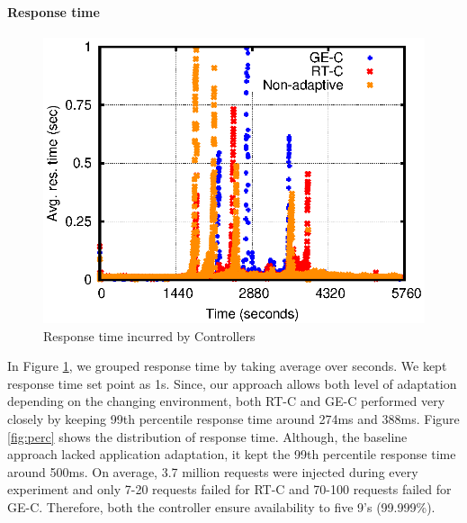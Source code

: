 \paragraph*{\textbf{Response time}}
\begin{figure} [htb]
\centering
\includegraphics[scale=.8]{Graphs/responseTime.eps}
\caption{Response time incurred by Controllers}
\label{fig:rt}
\end{figure}
In Figure \ref{fig:rt}, we grouped response time by taking average over seconds. We kept response time set point as 1s. Since, our approach allows both level of adaptation depending on the changing environment, both RT-C and GE-C performed very closely by keeping 99th percentile response time around 274ms and 388ms. Figure \ref{fig:perc} shows the distribution of response time. Although, the baseline approach lacked application adaptation, it kept the 99th percentile response time around 500ms. On average, 3.7 million requests were injected during every experiment and only 7-20 requests failed for RT-C and 70-100 requests failed for GE-C. Therefore, both the controller ensure availability to five 9's (99.999\%).



